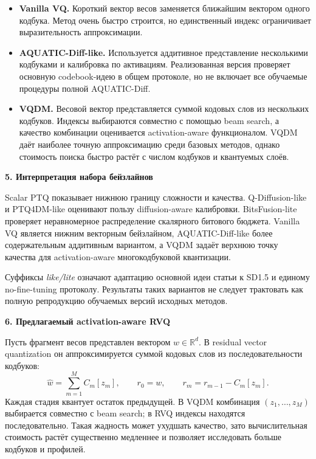 \documentclass[11pt,a4paper]{article}
\newcommand{\sectiontitle}[1]{%
  \vspace{0.18cm}
  {\large\bfseries\color{msublue} #1}\par\vspace{0.08cm}
}
\newcommand{\note}[1]{%
  \begingroup
  \setlength{\fboxsep}{6pt}
  \noindent\colorbox{softblue}{\parbox{\dimexpr\textwidth-2\fboxsep\relax}{#1}}
  \endgroup
}
\begin{document}
\begin{itemize}\setlength\itemsep{0.28cm}\setlength\topsep{0.06cm}
  \item \textbf{Vanilla VQ.} Короткий вектор весов заменяется ближайшим вектором одного кодбука. Метод очень быстро строится, но единственный индекс ограничивает выразительность аппроксимации.

  \item \textbf{AQUATIC-Diff-like.} Используется аддитивное представление несколькими кодбуками и калибровка по активациям. Реализованная версия проверяет основную codebook-идею в общем протоколе, но не включает все обучаемые процедуры полной AQUATIC-Diff.

  \item \textbf{VQDM.} Весовой вектор представляется суммой кодовых слов из нескольких кодбуков. Индексы выбираются совместно с помощью beam search, а качество комбинации оценивается activation-aware функционалом. VQDM даёт наиболее точную аппроксимацию среди базовых методов, однако стоимость поиска быстро растёт с числом кодбуков и квантуемых слоёв.
\end{itemize}

\sectiontitle{5. Интерпретация набора бейзлайнов}

Scalar PTQ показывает нижнюю границу сложности и качества. Q-Diffusion-like и PTQ4DM-like оценивают пользу diffusion-aware калибровки. BitsFusion-lite проверяет неравномерное распределение скалярного битового бюджета. Vanilla VQ является нижним векторным бейзлайном, AQUATIC-Diff-like \textemdash{} более содержательным аддитивным вариантом, а VQDM задаёт верхнюю точку качества для activation-aware многокодбуковой квантизации.

\note{Суффиксы \textit{like/lite} означают адаптацию основной идеи статьи к SD1.5 и единому no-fine-tuning протоколу. Результаты таких вариантов не следует трактовать как полную репродукцию обучаемых версий исходных методов.}

\newpage

\sectiontitle{6. Предлагаемый activation-aware RVQ}

Пусть фрагмент весов представлен вектором $w\in\mathbb{R}^{d}$. В residual vector quantization он аппроксимируется суммой кодовых слов из последовательности кодбуков:
\[
  \hat w=\sum_{m=1}^{M}C_m[z_m],
  \qquad r_0=w,\qquad r_m=r_{m-1}-C_m[z_m].
\]
Каждая стадия квантует остаток предыдущей. В VQDM комбинация $(z_1,\ldots,z_M)$ выбирается совместно с beam search; в RVQ индексы находятся последовательно. Такая жадность может ухудшать качество, зато вычислительная стоимость растёт существенно медленнее и позволяет исследовать больше кодбуков и профилей.
\end{document}
